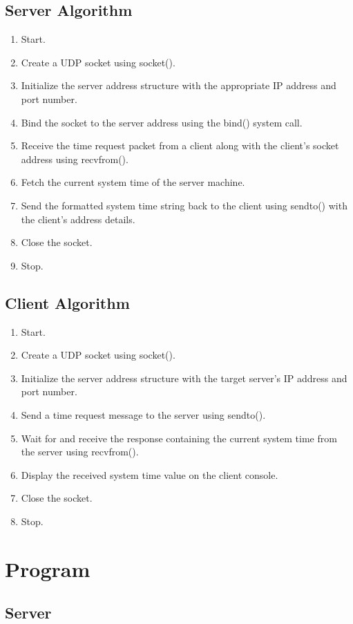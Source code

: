 \documentclass[12pt, a4paper]{report}
\begin{document}
\subsection*{Server Algorithm}
\begin{enumerate}
	\item Start.
	\item Create a UDP socket using socket().
	\item Initialize the server address structure with the appropriate IP address and port number.
	\item Bind the socket to the server address using the bind() system call.
	\item Receive the time request packet from a client along with the client's socket address using recvfrom().
	\item Fetch the current system time of the server machine.
	\item Send the formatted system time string back to the client using sendto() with the client's address details.
	\item Close the socket.
	\item Stop.
\end{enumerate}

\subsection*{Client Algorithm}
\begin{enumerate}
	\item Start.
	\item Create a UDP socket using socket().
	\item Initialize the server address structure with the target server's IP address and port number.
	\item Send a time request message to the server using sendto().
	\item Wait for and receive the response containing the current system time from the server using recvfrom().
	\item Display the received system time value on the client console.
	\item Close the socket.
	\item Stop.
\end{enumerate}

\section*{Program}

\subsection*{Server}

\end{document}
